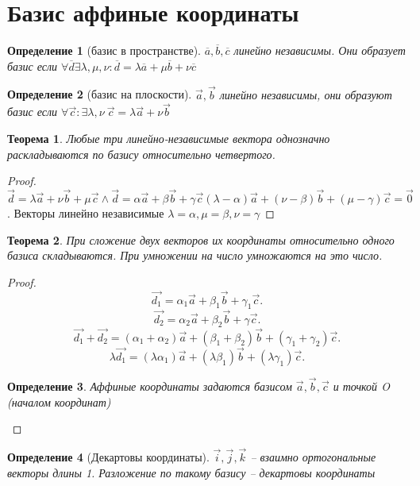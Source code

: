 \documentclass{scrartcl}
\newtheorem{theorem}{Теорема}
\newtheorem{definition}{Определение}
\begin{document}
    \section{Базис аффиные координаты}
    \begin{definition}[базис в пространстве]
        $\overline{a},\overline{b},\overline{c}$ линейно независимы. Они образует базис если $ \forall \overline{d} \exists  \lambda ,\mu, \nu: \overline{d} = \lambda \overline{a} + \mu \overline{b} + \nu \overline{c}$
    \end{definition}
    \begin{definition}[базис на плоскости]
        $\vec{a}, \vec{b} $ линейно независимы, они образуют базис если $\forall  \vec{c} : \exists \lambda, \nu ~ \vec{c} = \lambda \vec{a} + \nu \vec{b}$
    \end{definition}
    \begin{theorem}
        Любые три линейно-независимые вектора однозначно раскладываются по базису относительно четвертого.
    \end{theorem}
    \begin{proof}
        $\vec{d} = \lambda \vec{a} + \nu \vec{b} + \mu \vec{c} \land \vec{d} = \alpha \vec{a} + \beta \vec{b} + \gamma \vec{c}  (\lambda - \alpha)\vec{a} + (\nu - \beta) \vec{b} + (\mu - \gamma) \vec{c} = \vec{0} $. Векторы линейно независимые $\lambda = \alpha , \mu =\beta , \nu = \gamma$
    \end{proof}
    \begin{theorem}
        При сложение двух векторов их координаты относительно одного базиса складываются. При умножении на число умножаются на это число.
    \end{theorem}
    \begin{proof}
        \[
        \vec{d_1} = \alpha_1 \vec{a} + \beta_1 \vec{b} + \gamma_1 \vec{c}
        .\] 
        \[
        \vec{d_2} = \alpha_2 \vec{a} + \beta_2 \vec{b} + \gamma \vec{c}
        .\] 
        \[
        \vec{d_1} + \vec{d_2} = (\alpha_1 + \alpha_2) \vec{a} + (\beta_1 + \beta_2)\vec{b} + (\gamma_1 + \gamma_2) \vec{c}
        .\] 
        \[
        \lambda \vec{d_1} = (\lambda \alpha_1)\vec{a} + (\lambda \beta_1)\vec{b} + (\lambda  \gamma_1) \vec{c}
        .\] 
        \begin{definition}
            Аффиные координаты задаются базисом $\vec{a}, \vec{b},\vec{c}$ 
            и точкой O (началом координат)
        \end{definition}
    \end{proof}
    \begin{definition}[Декартовы координаты]
        $\vec{i},\vec{j},\vec{k}$ -- взаимно ортогональные векторы длины 1. Разложение по такому базису -- декартовы координаты
    \end{definition}
\end{document}
